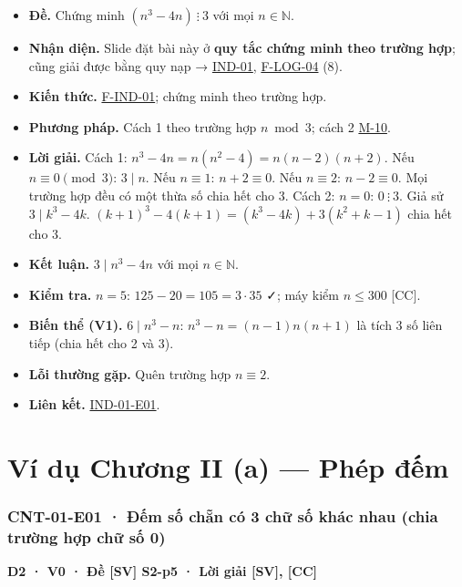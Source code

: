 \documentclass[
  10pt,
  twoside,openany]{book}
\providecommand{\tightlist}{%
  \setlength{\itemsep}{0pt}\setlength{\parskip}{0pt}}
\begin{document}
\begin{itemize}
\tightlist
\item
  \textbf{Đề.} Chứng minh \((n^3-4n)\ \vdots\ 3\) với mọi
  \(n\in\mathbb N\).
\item
  \textbf{Nhận diện.} Slide đặt bài này ở \textbf{quy tắc chứng minh
  theo trường hợp}; cũng giải được bằng quy nạp →
  \protect\hyperlink{IND-01}{IND-01},
  \protect\hyperlink{F-LOG-04}{F-LOG-04} (8).
\item
  \textbf{Kiến thức.} \protect\hyperlink{F-IND-01}{F-IND-01}; chứng minh
  theo trường hợp.
\item
  \textbf{Phương pháp.} Cách 1 theo trường hợp \(n\bmod3\); cách 2
  \protect\hyperlink{M-10}{M-10}.
\item
  \textbf{Lời giải.} Cách 1: \(n^3-4n=n(n^2-4)=n(n-2)(n+2)\). Nếu
  \(n\equiv0\pmod3\): \(3\mid n\). Nếu \(n\equiv1\): \(n+2\equiv0\). Nếu
  \(n\equiv2\): \(n-2\equiv0\). Mọi trường hợp đều có một thừa số chia
  hết cho 3. Cách 2: \(n=0\): \(0\ \vdots\ 3\). Giả sử \(3\mid k^3-4k\).
  \((k+1)^3-4(k+1)=(k^3-4k)+3(k^2+k-1)\) chia hết cho 3.
\item
  \textbf{Kết luận.} \(3\mid n^3-4n\) với mọi \(n\in\mathbb N\).
\item
  \textbf{Kiểm tra.} \(n=5\): \(125-20=105=3\cdot35\) ✓; máy kiểm
  \(n\le300\) {[}CC{]}.
\item
  \textbf{Biến thể (V1).} \(6\mid n^3-n\): \(n^3-n=(n-1)n(n+1)\) là tích
  3 số liên tiếp (chia hết cho 2 và 3).
\item
  \textbf{Lỗi thường gặp.} Quên trường hợp \(n\equiv2\).
\item
  \textbf{Liên kết.} \protect\hyperlink{IND-01-E01}{IND-01-E01}.
\end{itemize}

\hypertarget{ex-ch2a}{%
\chapter{Ví dụ Chương II (a) --- Phép đếm}\label{ex-ch2a}}

\hypertarget{CNT-01-E01}{%
\subsection{CNT-01-E01 · Đếm số chẵn có 3 chữ số khác nhau (chia trường
hợp chữ số 0)}\label{CNT-01-E01}}

\textbf{D2 · V0 · Đề {[}SV{]} S2-p5 · Lời giải {[}SV{]}, {[}CC{]}}
\end{document}
